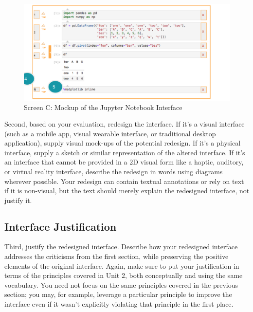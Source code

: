 \documentclass[12pt,letterpaper]{article}
\begin{document}
\begin{figure}[h]
\centering
\includegraphics[scale=.6]{figures/project-principles/jupyter_mock_screen_c.png}
\caption{Screen C: Mockup of the Jupyter Notebook Interface}
\label{fig::6}
\end{figure}

Second, based on your evaluation, redesign the interface. If it’s a visual interface (such as a mobile app, visual wearable interface, or traditional desktop application), supply visual mock-ups of the potential redesign. If it’s a physical interface, supply a sketch or similar representation of the altered interface. If it’s an interface that cannot be provided in a 2D visual form like a haptic, auditory, or virtual reality interface, describe the redesign in words using diagrams wherever possible. Your redesign can contain textual annotations or rely on text if it is non-visual, but the text should merely explain the redesigned interface, not justify it.

\subsection*{Interface Justification}
Third, justify the redesigned interface. Describe how your redesigned interface addresses the criticisms from the first section, while preserving the positive elements of the original interface. Again, make sure to put your justification in terms of the principles covered in Unit 2, both conceptually and using the same vocabulary. You need not focus on the same principles covered in the previous section; you may, for example, leverage a particular principle to improve the interface even if it wasn’t explicitly violating that principle in the first place.

 

\end{document}
